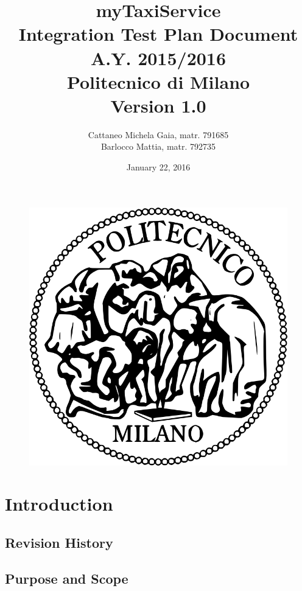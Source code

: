 \documentclass[18pt,oneside,a4paper, titlepage]{article}
\begin{document}
\begin{figure}[t]
	\centering
	\includegraphics[scale=0.35]{logo-polimi.png}
\end{figure}
\title{\textbf{myTaxiService}\\\textbf{I}ntegration \textbf{T}est \textbf{P}lan \textbf{D}ocument\\ A.Y. 2015/2016\\
	Politecnico di Milano \\ Version 1.0}	
\author{Cattaneo Michela Gaia, matr. 791685\\Barlocco Mattia, matr. 792735 }
\date{January 22, 2016}
\maketitle

\newpage
	\tableofcontents

\newpage
\section{Introduction}
	\subsection{Revision History}
	\subsection{Purpose	and	Scope}
\end{document}
